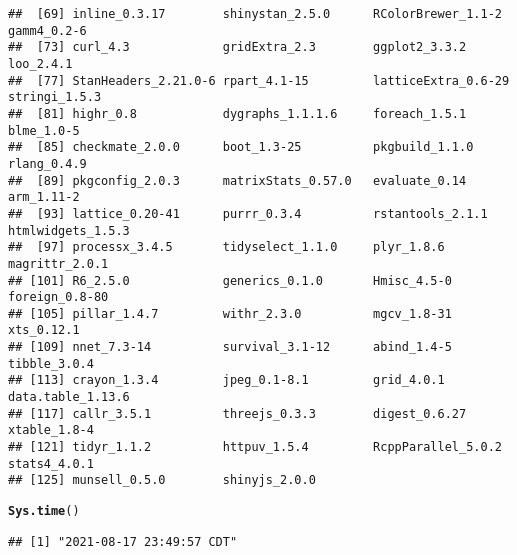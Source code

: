 \documentclass{article}\usepackage[]{graphicx}\usepackage[]{color}
\makeatletter
\newcommand{\hlstd}[1]{\textcolor[rgb]{0.345,0.345,0.345}{#1}}%
\newcommand{\hlkwd}[1]{\textcolor[rgb]{0.737,0.353,0.396}{\textbf{#1}}}%
\newenvironment{kframe}{%
 \def\at@end@of@kframe{}%
 \ifinner\ifhmode%
  \def\at@end@of@kframe{\end{minipage}}%
  \begin{minipage}{\columnwidth}%
 \fi\fi%
 \def\FrameCommand##1{\hskip\@totalleftmargin \hskip-\fboxsep
 \colorbox{shadecolor}{##1}\hskip-\fboxsep
     \hskip-\linewidth \hskip-\@totalleftmargin \hskip\columnwidth}%
 \MakeFramed {\advance\hsize-\width
   \@totalleftmargin\z@ \linewidth\hsize
   \@setminipage}}%
 {\par\unskip\endMakeFramed%
 \at@end@of@kframe}
\newenvironment{knitrout}{}{} %
\makeatother
\begin{document}
\begin{knitrout}
\begin{kframe}
\begin{verbatim}
##  [69] inline_0.3.17        shinystan_2.5.0      RColorBrewer_1.1-2   gamm4_0.2-6         
##  [73] curl_4.3             gridExtra_2.3        ggplot2_3.3.2        loo_2.4.1           
##  [77] StanHeaders_2.21.0-6 rpart_4.1-15         latticeExtra_0.6-29  stringi_1.5.3       
##  [81] highr_0.8            dygraphs_1.1.1.6     foreach_1.5.1        blme_1.0-5          
##  [85] checkmate_2.0.0      boot_1.3-25          pkgbuild_1.1.0       rlang_0.4.9         
##  [89] pkgconfig_2.0.3      matrixStats_0.57.0   evaluate_0.14        arm_1.11-2          
##  [93] lattice_0.20-41      purrr_0.3.4          rstantools_2.1.1     htmlwidgets_1.5.3   
##  [97] processx_3.4.5       tidyselect_1.1.0     plyr_1.8.6           magrittr_2.0.1      
## [101] R6_2.5.0             generics_0.1.0       Hmisc_4.5-0          foreign_0.8-80      
## [105] pillar_1.4.7         withr_2.3.0          mgcv_1.8-31          xts_0.12.1          
## [109] nnet_7.3-14          survival_3.1-12      abind_1.4-5          tibble_3.0.4        
## [113] crayon_1.3.4         jpeg_0.1-8.1         grid_4.0.1           data.table_1.13.6   
## [117] callr_3.5.1          threejs_0.3.3        digest_0.6.27        xtable_1.8-4        
## [121] tidyr_1.1.2          httpuv_1.5.4         RcppParallel_5.0.2   stats4_4.0.1        
## [125] munsell_0.5.0        shinyjs_2.0.0
\end{verbatim}
\begin{alltt}
\hlkwd{Sys.time}\hlstd{()}
\end{alltt}
\begin{verbatim}
## [1] "2021-08-17 23:49:57 CDT"
\end{verbatim}
\end{kframe}
\end{knitrout}
\end{document}
